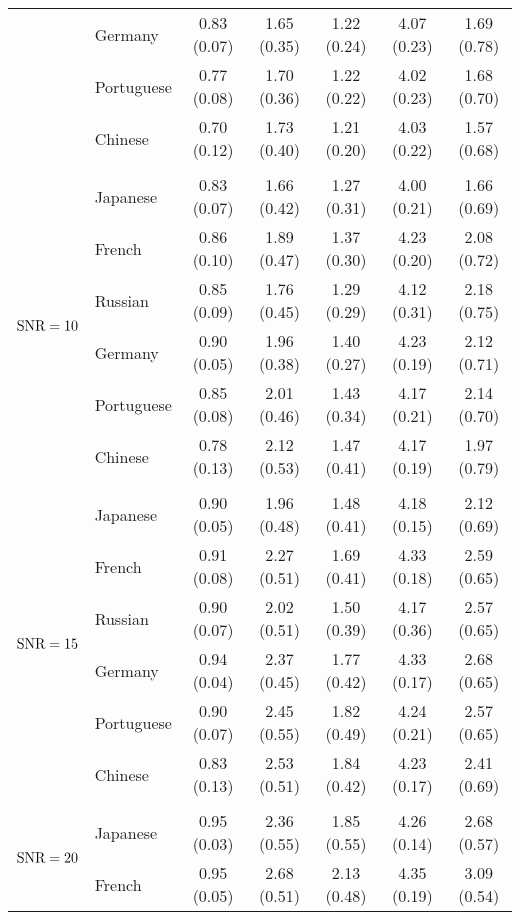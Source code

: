 \begin{table}[h]
\begin{tabular}{l l c c c c c}
				& Germany        & 0.83 (0.07)   & 1.65 (0.35)   & 1.22 (0.24)   & 4.07 (0.23)   & 1.69 (0.78) \\
				& Portuguese       & 0.77 (0.08)   & 1.70 (0.36)   & 1.22 (0.22)   & 4.02 (0.23)   & 1.68 (0.70) \\
				& Chinese        & 0.70 (0.12)   & 1.73 (0.40)   & 1.21 (0.20)   & 4.03 (0.22)   & 1.57 (0.68) \\
				&&&&&&\\
				\multirow{6}{*}{$\text{SNR}=10$}        & Japanese       & 0.83 (0.07)   & 1.66 (0.42)   & 1.27 (0.31)   & 4.00 (0.21)   & 1.66 (0.69) \\
				& French       & 0.86 (0.10)   & 1.89 (0.47)   & 1.37 (0.30)   & 4.23 (0.20)   & 2.08 (0.72) \\
				& Russian        & 0.85 (0.09)   & 1.76 (0.45)   & 1.29 (0.29)   & 4.12 (0.31)   & 2.18 (0.75) \\
				& Germany        & 0.90 (0.05)   & 1.96 (0.38)   & 1.40 (0.27)   & 4.23 (0.19)   & 2.12 (0.71) \\
				& Portuguese       & 0.85 (0.08)   & 2.01 (0.46)   & 1.43 (0.34)   & 4.17 (0.21)   & 2.14 (0.70) \\
				& Chinese        & 0.78 (0.13)   & 2.12 (0.53)   & 1.47 (0.41)   & 4.17 (0.19)   & 1.97 (0.79) \\
				&&&&&&\\
				\multirow{6}{*}{$\text{SNR}=15$}        & Japanese       & 0.90 (0.05)   & 1.96 (0.48)   & 1.48 (0.41)   & 4.18 (0.15)   & 2.12 (0.69) \\
				& French       & 0.91 (0.08)   & 2.27 (0.51)   & 1.69 (0.41)   & 4.33 (0.18)   & 2.59 (0.65) \\
				& Russian        & 0.90 (0.07)   & 2.02 (0.51)   & 1.50 (0.39)   & 4.17 (0.36)   & 2.57 (0.65) \\
				& Germany        & 0.94 (0.04)   & 2.37 (0.45)   & 1.77 (0.42)   & 4.33 (0.17)   & 2.68 (0.65) \\
				& Portuguese       & 0.90 (0.07)   & 2.45 (0.55)   & 1.82 (0.49)   & 4.24 (0.21)   & 2.57 (0.65) \\
				& Chinese        & 0.83 (0.13)   & 2.53 (0.51)   & 1.84 (0.42)   & 4.23 (0.17)   & 2.41 (0.69) \\
				&&&&&&\\
				\multirow{6}{*}{$\text{SNR}=20$}        & Japanese       & 0.95 (0.03)   & 2.36 (0.55)   & 1.85 (0.55)   & 4.26 (0.14)   & 2.68 (0.57) \\
				& French       & 0.95 (0.05)   & 2.68 (0.51)   & 2.13 (0.48)   & 4.35 (0.19)   & 3.09 (0.54) \\

\end{tabular}
\end{table}
